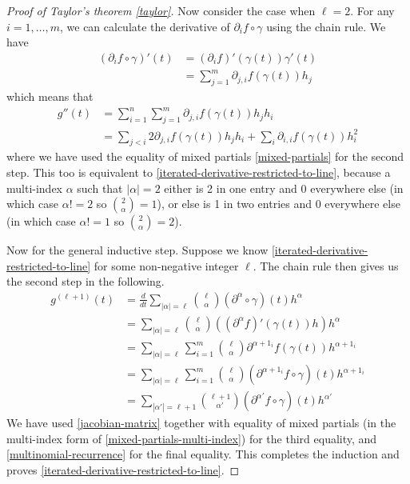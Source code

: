 \begin{proof}[Proof of Taylor's theorem \ref{taylor}]
	Now consider the case when $\ell = 2$. For any $i = 1, \dotsc, m$, we can calculate the derivative of $\partial_i f \circ \gamma$ using the chain rule. We have
	\[ \begin{aligned} (\partial_i f \circ \gamma)'(t) &= (\partial_i f)'(\gamma(t))\gamma'(t) \\
	&= \sum_{j = 1}^m \partial_{j,i} f (\gamma(t)) h_j \end{aligned} \]
	which means that 
	\[ \begin{aligned} g''(t) &= \sum_{i = 1}^n \sum_{j = 1}^m \partial_{j,i} f(\gamma(t)) h_j h_i \\
	&= \sum_{j < i} 2\partial_{j,i}f(\gamma(t)) h_j h_i + \sum_i \partial_{i,i} f(\gamma(t)) h_i^2 \end{aligned} \]
	where we have used the equality of mixed partials \ref{mixed-partials} for the second step. This too is equivalent to \cref{iterated-derivative-restricted-to-line}, because a multi-index $\alpha$ such that $|\alpha| = 2$ either is 2 in one entry and 0 everywhere else (in which case $\alpha! = 2$ so $\binom{2}{\alpha} = 1$), or else is 1 in two entries and 0 everywhere else (in which case $\alpha! = 1$ so $\binom{2}{\alpha} = 2$).
	
	Now for the general inductive step. Suppose we know \cref{iterated-derivative-restricted-to-line} for some non-negative integer $\ell$. The chain rule then gives us the second step in the following. 
	\[ \begin{aligned} g^{(\ell+1)}(t) &= \frac{d}{dt} \sum_{|\alpha| = \ell} \binom{\ell}{\alpha} (\partial^\alpha \circ \gamma)(t) h^\alpha \\
	&= \sum_{|\alpha| = \ell} \binom{\ell}{\alpha} \left( (\partial^\alpha f)'(\gamma(t)) h \right) h^\alpha \\
	&= \sum_{|\alpha| = \ell} \sum_{i = 1}^m \binom{\ell}{\alpha} \partial^{\alpha + 1_i} f(\gamma(t)) h^{\alpha + 1_i} \\
	&= \sum_{|\alpha| = \ell} \sum_{i = 1}^m \binom{\ell}{\alpha} (\partial^{\alpha + 1_i} f \circ \gamma)(t) h^{\alpha + 1_i} \\
	&= \sum_{|\alpha'| = \ell + 1} \binom{\ell + 1}{\alpha'} (\partial^{\alpha'}f \circ \gamma)(t) h^{\alpha'}  \end{aligned} \]
	We have used \cref{jacobian-matrix} together with equality of mixed partials (in the multi-index form of \cref{mixed-partials-multi-index}) for the third equality, and \cref{multinomial-recurrence} for the final equality. This completes the induction and proves \cref{iterated-derivative-restricted-to-line}. 
	

\end{proof}
